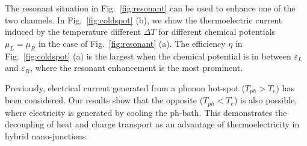 \documentclass[aps,prb,
,floatfix,footinbib,shortbibliography,
preprint
]{revtex4-1}
\begin{document}








 The resonant situation in Fig.~\ref{fig:resonant} can be used to enhance one of the two channels. In Fig.~\ref{fig:coldspot} (b), we show the thermoelectric current induced by the temperature different $\Delta T$ for different chemical potentials $\mu_L=\mu_R$ in the case of Fig.~\ref{fig:resonant} (a). The efficiency $\eta$ in Fig.~\ref{fig:coldspot} (a) is the largest when the chemical potential is in between $\varepsilon_L$ and $\varepsilon_R$, where the resonant enhancement is the most prominent.

 Previously, electrical current generated from a phonon hot-spot ($T_{ph}>T_e$) has been considered\cite{entinwuhlman2010three}. Our results show that the opposite ($T_{ph}<T_e$) is also possible, where electricity is generated by cooling the ph-bath. This demonstrates the decoupling of heat and charge transport as an advantage of thermoelectricity in hybrid nano-junctions.
\end{document}
